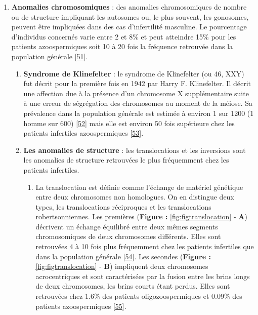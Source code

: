 \documentclass[12pt,twoside]{ugathesis}
\providecommand{\tightlist}{%
  \setlength{\itemsep}{0pt}\setlength{\parskip}{0pt}}
\theoremstyle{definition}
\theoremstyle{definition}
\theoremstyle{remark}
\begin{document}
\begin{enumerate}
\def\labelenumi{\arabic{enumi}.}
\setcounter{enumi}{1}
\tightlist
\item
  \textbf{Anomalies chromosomiques} : des anomalies chromosomiques de
  nombre ou de structure impliquant les autosomes ou, le plus souvent,
  les gonosomes, peuvent être impliquées dans des cas d'infertilité
  masculine. Le pourcentage d'individus concernés varie entre 2 et 8\%
  et peut atteindre 15\% pour les patients azoospermiques soit 10 à 20
  fois la fréquence retrouvée dans la population générale
  {[}\protect\hyperlink{ref-Ravel2006}{51}{]}.

  \begin{enumerate}
  \def\labelenumii{\alph{enumii}.}
  \item
    \textbf{Syndrome de Klinefelter} : le syndrome de Klinefelter (ou
    46, XXY) fut décrit pour la première fois en 1942 par Harry F.
    Klinefelter. Il décrit une affection due à la présence d'un
    chromosome X supplémentaire suite à une erreur de ségrégation des
    chromosomes au moment de la méiose. Sa prévalence dans la population
    générale est estimée à environ 1 sur 1200 (1 homme sur 600)
    {[}\protect\hyperlink{ref-Bojesen2011}{52}{]} mais elle est environ
    50 fois supérieure chez les patients infertiles azoospermiques
    {[}\protect\hyperlink{ref-Gekas2001}{53}{]}.
  \item
    \textbf{Les anomalies de structure} : les translocations et les
    inversions sont les anomalies de structure retrouvées le plus
    fréquemment chez les patients infertiles.

    \begin{enumerate}
    \def\labelenumiii{\roman{enumiii}.}
    \tightlist
    \item
      La translocation est définie comme l'échange de matériel génétique
      entre deux chromosomes non homologues. On en distingue deux types,
      les translocations réciproques et les translocations
      robertsonniennes. Les premières (\textbf{Figure :}
      \ref{fig:figtranslocation} - \textbf{A}) décrivent un échange
      équilibré entre deux mêmes segments chromosomiques de deux
      chromosomes différents. Elles sont retrouvées 4 à 10 fois plus
      fréquemment chez les patients infertiles que dans la population
      générale {[}\protect\hyperlink{ref-Elliott1997}{54}{]}. Les
      secondes (\textbf{Figure :} \ref{fig:figtranslocation} -
      \textbf{B}) impliquent deux chromosomes acrocentriques et sont
      caractérisées par la fusion entre les brins longs de deux
      chromosomes, les brins courts étant perdus. Elles sont retrouvées
      chez 1.6\% des patients oligozoospermiques et 0.09\% des patients
      azoospermiques {[}\protect\hyperlink{ref-OFlynnOBrien2010}{55}{]}.
    \end{enumerate}
  \end{enumerate}
\end{enumerate}
\end{document}

